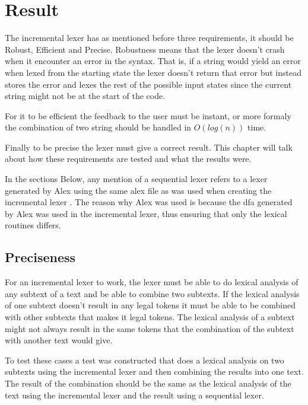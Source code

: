 \chapter{Result}
The incremental lexer has as mentioned before three requirements, it should be
Robust, Efficient and Precise. Robustness means that the lexer doesn't crash
when it encounter an error in the syntax. That is, if a string would yield an
error when lexed from the starting state the lexer doesn't return that error but
instead stores the error and lexes the rest of the possible input states since
the current string might not be at the start of the code.

For it to be efficient
the feedback to the user must be instant, or more formaly the combination of two
string should be handled in $O(log(n))$ time.

Finally to be precise the lexer
must give a correct result. This chapter will talk about how these requirements
are tested and what the results were.

In the sections Below, any mention of a sequential lexer refers to a lexer
generated by Alex using the same alex file as was used when creating the
incremental lexer \cite{alex}. The reason why Alex was used is because the dfa
generated by Alex was used in the incremental lexer, thus ensuring that only the
lexical routines differs.

\section{Preciseness}
For an incremental lexer to work, the lexer must be able to do lexical analysis
of any subtext of a text and be able to combine two subtexts. If the lexical
analysis of one subtext doesn't result in any legal tokens it must be able to be
combined with other subtexts that makes it legal tokens. The lexical analysis of
a subtext might not always result in the same tokens that the combination of the
subtext with another text would give.

To test these cases a test was constructed that does a lexical analysis on two
subtexts using the incremental lexer and then combining the results into one
text. The result of the combination should be the same as the lexical analysis
of the text using the incremental lexer and the result using a sequential lexer.

